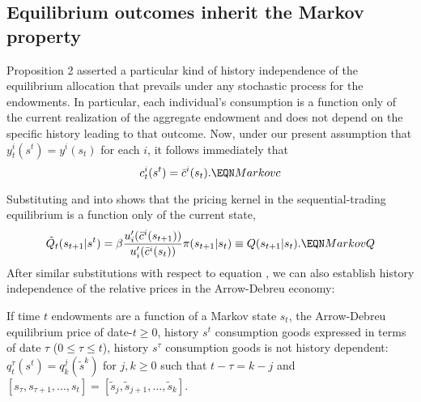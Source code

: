 \subsection{Equilibrium outcomes inherit the Markov property}
Proposition 2  asserted a particular kind of history independence
of the equilibrium allocation that prevails under any
stochastic process for the endowments. In particular, each
individual's consumption is  a function only of the current
realization of the aggregate endowment and does not depend on the
specific history leading to that outcome. Now, under %
our present assumption that $y_t^i(s^t)= y^i(s_t)$ for each $i$, it follows immediately that
$$
c^i_t(s^t) = \bar c^i(s_t).     \EQN Markovc
$$

Substituting  and  into
 shows that the pricing kernel in the sequential-trading
equilibrium is   a function only of the current state,
$$
\tilde Q_t(s_{t+1} | s^t) = \beta
{ u'_i(\bar c^i(s_{t+1})) \over u'_i(\bar c^i(s_t)) }
\pi(s_{t+1} | s_t) \equiv Q(s_{t+1} | s_t).   \EQN MarkovQ
$$
After similar substitutions with respect to equation ,
we can also
establish history independence of the relative prices in the
Arrow-Debreu economy:




\medskip
{}  If time $t$  endowments are a function of a Markov
state $s_t$, the Arrow-Debreu equilibrium price of date-$t\geq 0$,
history $s^t$
consumption goods expressed in terms of date $\tau$ ($0\leq \tau \leq t$),
history $s^\tau$
consumption goods is not history dependent:
$q^\tau_t(s^t) = q^{j}_{k}(\tilde s^{k})$ for $j, k \geq 0$
such that $t-\tau=k-j$ and
$[s_\tau, s_{\tau+1}, \ldots , s_t] =
 [\tilde s_{j}, \tilde s_{j+1}, \ldots , \tilde s_{k}]$.
\medskip


